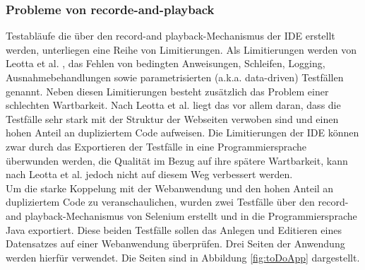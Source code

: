 \subsubsection{Probleme von recorde-and-playback}
\label{sec:probleme_von_recorde_and_playback}
Testabläufe die über den \grq record-and playback\grq -Mechanismus der IDE erstellt werden, unterliegen eine Reihe von Limitierungen. Als Limitierungen werden von Leotta et al. \cite{leotta_repairing_2013}, das Fehlen von bedingten Anweisungen, Schleifen, Logging, Ausnahmebehandlungen sowie parametrisierten (a.k.a. data-driven) Testfällen genannt.
Neben diesen Limitierungen besteht zusätzlich das Problem einer schlechten Wartbarkeit. Nach Leotta et al. \cite{leotta_repairing_2013} liegt das vor allem daran, dass die Testfälle sehr stark mit der Struktur der Webseiten verwoben sind und einen hohen Anteil an dupliziertem Code aufweisen.
Die Limitierungen der IDE können zwar durch das Exportieren der Testfälle in eine Programmiersprache überwunden werden, die Qualität im Bezug auf ihre spätere Wartbarkeit, kann nach  Leotta et al. \cite{leotta_repairing_2013} jedoch nicht auf diesem Weg verbessert werden.\\
Um die starke Koppelung mit der Webanwendung und den hohen Anteil an dupliziertem Code zu veranschaulichen, wurden zwei Testfälle über den \grq record-and playback\grq -Mechanismus von Selenium erstellt und in die Programmiersprache Java exportiert.
Diese beiden Testfälle sollen das Anlegen und Editieren eines Datensatzes auf einer Webanwendung überprüfen.
Drei Seiten der Anwendung werden hierfür verwendet. Die Seiten sind in Abbildung \ref{fig:toDoApp} dargestellt.

